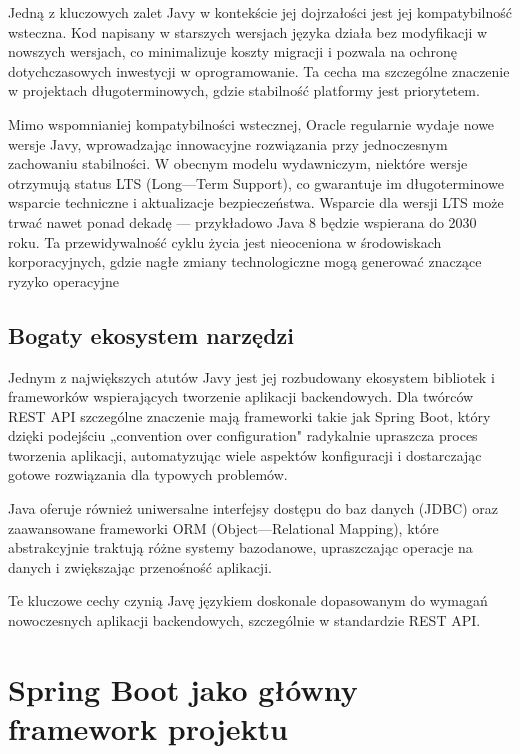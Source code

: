 \documentclass[a4paper,12pt,openany]{book}
\begin{document}
Jedną z kluczowych zalet Javy w kontekście jej dojrzałości jest jej kompatybilność wsteczna. Kod napisany w starszych wersjach języka działa bez modyfikacji w nowszych wersjach, co minimalizuje koszty migracji i pozwala na ochronę dotychczasowych inwestycji w oprogramowanie. Ta cecha ma szczególne znaczenie w projektach długoterminowych, gdzie stabilność platformy jest priorytetem.

Mimo wspomnianiej kompatybilności wstecznej, Oracle regularnie wydaje nowe wersje Javy, wprowadzając innowacyjne rozwiązania przy jednoczesnym zachowaniu stabilności. W obecnym modelu wydawniczym, niektóre wersje otrzymują status LTS (Long---Term Support), co gwarantuje im długoterminowe wsparcie techniczne i aktualizacje bezpieczeństwa. Wsparcie dla wersji LTS może trwać nawet ponad dekadę --- przykładowo Java 8 będzie wspierana do 2030 roku. Ta przewidywalność cyklu życia jest nieoceniona w środowiskach korporacyjnych, gdzie nagłe zmiany technologiczne mogą generować znaczące ryzyko operacyjne

\subsection*{Bogaty ekosystem narzędzi}

Jednym z największych atutów Javy jest jej rozbudowany ekosystem bibliotek i frameworków wspierających tworzenie aplikacji backendowych. Dla twórców REST API szczególne znaczenie mają frameworki takie jak Spring Boot, który dzięki podejściu „convention over configuration" radykalnie upraszcza proces tworzenia aplikacji, automatyzując wiele aspektów konfiguracji i dostarczając gotowe rozwiązania dla typowych problemów.

Java oferuje również uniwersalne interfejsy dostępu do baz danych (JDBC) oraz zaawansowane frameworki ORM (Object---Relational Mapping), które abstrakcyjnie traktują różne systemy bazodanowe, upraszczając operacje na danych i zwiększając przenośność aplikacji.

\vspace{0.5cm}

Te kluczowe cechy czynią Javę językiem doskonale dopasowanym do wymagań nowoczesnych aplikacji backendowych, szczególnie w standardzie REST API.


\section{Spring Boot jako główny framework projektu}
\end{document}

